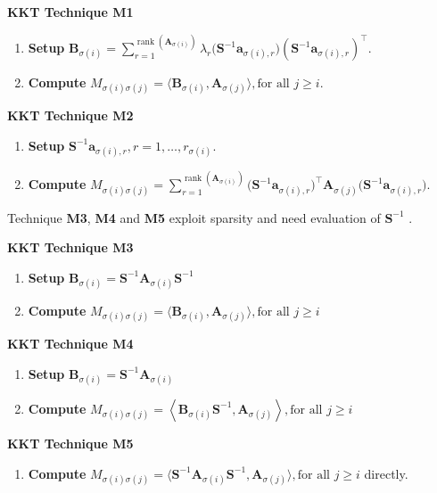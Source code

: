 {	\begin{minipage}{0.8\textwidth}
		{\textbf{KKT Technique M1}}
\begin{enumerate}
  \item {\textbf{Setup}} $\mathbf{B}_{\sigma (i)} = \sum_{r =
  1}^{\ensuremath{\operatorname{rank}} ( \mathbf{A}_{\sigma (i)} )} \lambda_r \big( \mathbf{S}^{- 1}
  \mathbf{a}_{\sigma (i), r} \big) ( \mathbf{S}^{- 1} \mathbf{a}_{\sigma (i), r})^{\top}$.
  
  \item {\textbf{Compute}} $M_{\sigma (i) \sigma (j)} = \langle
  \mathbf{B}_{\sigma (i)}, \mathbf{A}_{\sigma (j)} \rangle, \text{for all } j \geq i$.
\end{enumerate}
{\textbf{KKT Technique M2}}
\begin{enumerate}
  \item {\textbf{Setup}} $\mathbf{S}^{- 1} \mathbf{a}_{\sigma (i), r}, r = 1, \ldots,
  r_{\sigma (i)}$.
  \item {\textbf{Compute}} $M_{\sigma (i) \sigma (j)} = \sum_{r =
  1}^{\ensuremath{\operatorname{rank}} ( \mathbf{A}_{\sigma (i)} )} \big( \mathbf{S}^{- 1}
  \mathbf{a}_{\sigma (i), r} )^{\top} \mathbf{A}_{\sigma (j)} ( \mathbf{S}^{- 1}
  \mathbf{a}_{\sigma (i), r} \big)$.\\
\end{enumerate}
\end{minipage}} 

Technique {\textbf{M3}}, {\textbf{M4}} and {\textbf{M5}} exploit sparsity and need evaluation of $\mathbf{S}^{-1}$ {\cite{fujisawa1997exploiting}}.\\

	{\begin{minipage}{0.8\textwidth}
{\textbf{KKT Technique M3}}
\begin{enumerate}
  \item {\textbf{Setup}} $\mathbf{B}_{\sigma (i)} = \mathbf{S}^{- 1} \mathbf{A}_{\sigma
  (i)} \mathbf{S}^{- 1}$
  \item {\textbf{Compute}} $M_{\sigma (i) \sigma (j)} = \langle
  \mathbf{B}_{\sigma (i)}, \mathbf{A}_{\sigma (j)} \rangle, \text{for all } j \geq i$
\end{enumerate}

{\textbf{KKT Technique M4}}
\begin{enumerate}
  \item {\textbf{Setup}} $\mathbf{B}_{\sigma (i)} = \mathbf{S}^{- 1} \mathbf{A}_{\sigma
  (i)}$
  
  \item {\textbf{Compute}} $M_{\sigma (i) \sigma (j)} = \left\langle
  \mathbf{B}_{\sigma (i)} \mathbf{S}^{- 1}, \mathbf{A}_{\sigma (j)} \right\rangle, \text{for all } j
  \geq i$
\end{enumerate}
{\textbf{KKT Technique M5}}
\begin{enumerate}
  \item {\textbf{Compute}} $M_{\sigma (i) \sigma (j)} = \langle \mathbf{S}^{-
  1} \mathbf{A}_{\sigma (i)} \mathbf{S}^{- 1}, \mathbf{A}_{\sigma (j)} \rangle, \text{for all } j \geq
  i$ directly.\\
\end{enumerate}
\end{minipage}}


